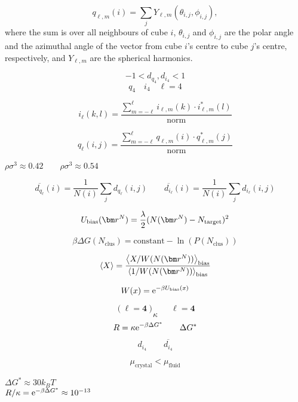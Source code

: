\documentclass[thesis]{subfiles}
\begin{document}
\begin{equation}
q_{\ell, m}(i) = \sum_{j} Y_{\ell, m} (\theta_{i, j}, \phi_{i, j}),
\end{equation}
where the sum is over all neighbours of cube $i$, $\theta_{i, j}$ and $\phi_{i, j}$ are the polar angle and the azimuthal angle of the vector from cube $i$'s centre to cube $j$'s centre, respectively, and $Y_{\ell, m}$ are the spherical harmonics.

$$-1 < d_{q_4}, d_{i_4} < 1$$
$$q_4 \quad i_4 \quad \ell = 4$$

\begin{equation}
{i_\ell}(k,l) = \frac{\sum_{m = -\ell}^\ell i_{\ell, m}(k) \cdot i^*_{\ell, m}(l)}{\textrm{norm}}
\end{equation}

\begin{equation}
{q_\ell}(i, j) = \frac{\sum_{m = -\ell}^\ell q_{\ell, m}(i) \cdot q^*_{\ell, m}(j)}{\textrm{norm}}
\end{equation}

$\rho\sigma^3 \approx 0.42\qquad \rho\sigma^3 \approx 0.54$

\begin{equation}
\overline{d_{q_\ell}}(i) = \frac{1}{N(i)} \sum_{j}^{} d_{q_\ell}(i, j)
\qquad
\overline{d_{i_\ell}}(i) = \frac{1}{N(i)} \sum_{j}^{} d_{i_\ell}(i, j)
\end{equation}

$$ U_\textrm{bias}(\bm r^N) = \frac{\lambda}{2}(N\argr - N_\textrm{target})^2 $$

\begin{equation}
\beta \Delta G(N_\textrm{clus}) = \textrm{constant} - \ln(P(N_\textrm{clus}))
\end{equation}

$$ \llangle X \rrangle = \frac{\llangle X / W(N\argr ) \rrangle_\textrm{bias}}{\llangle 1/W(N\argr) \rrangle_\textrm{bias}} $$

$$ W(x) = \mathrm{e}^{-\beta U_\textrm{bias}(x)} $$

$$ \bm{( \ell = 4) \qquad \ell = 4 }$$
$$ \kappa $$
$$ R = \kappa \mathrm{e}^{-\beta \Delta G^*} \qquad \Delta G^*$$

$$ d_{i_4} \qquad \overline{d_{i_4}} $$

$$ \mu_\textrm{crystal} < \mu_\textrm{fluid} $$

$ \Delta G^* \approx 30 k_BT $\\
$ R/\kappa = \mathrm{e}^{-\beta \Delta G^*} \approx 10^{-13} $
\end{document}
